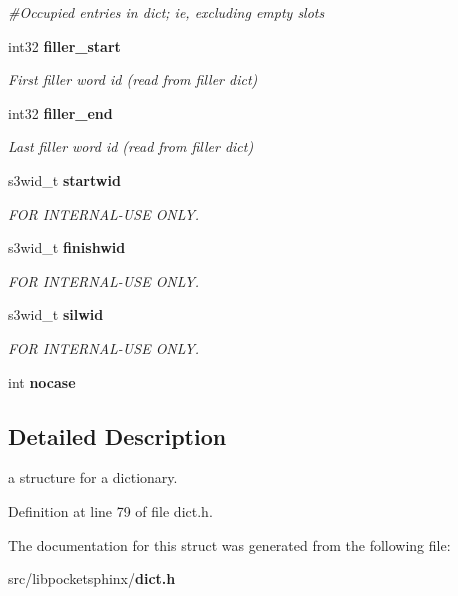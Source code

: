 \begin{DoxyCompactItemize}
\begin{DoxyCompactList}\small\item\em \#\-Occupied entries in dict; ie, excluding empty slots \end{DoxyCompactList}\item 
int32 {\bf filler\-\_\-start}\label{structdict__t_abd48fdafaaa68a8df2fd82163c51a95c}

\begin{DoxyCompactList}\small\item\em First filler word id (read from filler dict) \end{DoxyCompactList}\item 
int32 {\bf filler\-\_\-end}\label{structdict__t_a77c6692e56308968804add1292275cb7}

\begin{DoxyCompactList}\small\item\em Last filler word id (read from filler dict) \end{DoxyCompactList}\item 
s3wid\-\_\-t {\bf startwid}\label{structdict__t_a22bc6c52ce9e04c4f3f7d0ba1972ee51}

\begin{DoxyCompactList}\small\item\em F\-O\-R I\-N\-T\-E\-R\-N\-A\-L-\/\-U\-S\-E O\-N\-L\-Y. \end{DoxyCompactList}\item 
s3wid\-\_\-t {\bf finishwid}\label{structdict__t_a3875be5336e2d9888f6d5cb83ded82c5}

\begin{DoxyCompactList}\small\item\em F\-O\-R I\-N\-T\-E\-R\-N\-A\-L-\/\-U\-S\-E O\-N\-L\-Y. \end{DoxyCompactList}\item 
s3wid\-\_\-t {\bf silwid}\label{structdict__t_aad07b22b94c360923f151c02890f6e68}

\begin{DoxyCompactList}\small\item\em F\-O\-R I\-N\-T\-E\-R\-N\-A\-L-\/\-U\-S\-E O\-N\-L\-Y. \end{DoxyCompactList}\item 
int {\bfseries nocase}\label{structdict__t_a2240400afe39fbee593ff7e33f97008c}

\end{DoxyCompactItemize}


\subsection{Detailed Description}
a structure for a dictionary. 

Definition at line 79 of file dict.\-h.



The documentation for this struct was generated from the following file\-:\begin{DoxyCompactItemize}
\item 
src/libpocketsphinx/{\bf dict.\-h}\end{DoxyCompactItemize}
